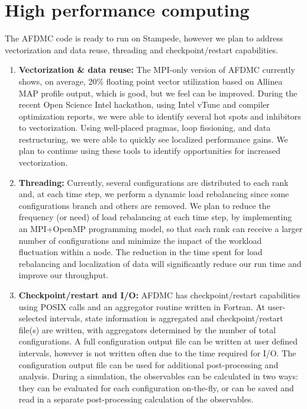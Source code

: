 \documentclass[12pt,letterpaper]{article}
\begin{document}
\section{High performance computing}

The AFDMC code is ready to run on Stampede, however we plan to address 
vectorization and data reuse, threading and checkpoint/restart capabilities.

\begin{enumerate}
\item \textbf{Vectorization \& data reuse:} The MPI-only version of AFDMC 
currently shows, on average, 20\% floating point vector utilization based on 
Allinea MAP profile output, which is good, but we feel can be improved. 
During the recent Open Science Intel hackathon, using Intel vTune and 
compiler optimization reports, we were able to identify several hot spots 
and inhibitors to vectorization. Using well-placed pragmas, loop fissioning, 
and data restructuring, we were able to quickly see localized performance 
gains. We plan to continue using these tools to identify opportunities for 
increased vectorization.

\item \textbf{Threading:}
Currently, several configurations are distributed to each rank and, at each 
time step, we perform a dynamic load rebalancing since some configurations 
branch and others are removed. We plan to reduce the frequency (or need) of 
load rebalancing at each time step, by implementing an MPI+OpenMP 
programming model, so that each rank can receive a larger number of 
configurations and minimize the impact of the workload fluctuation within a 
node. The reduction in the time spent for load rebalancing and localization 
of data will significantly reduce our run time and improve our throughput.

\item \textbf{Checkpoint/restart and I/O:}
AFDMC has checkpoint/restart capabilities using POSIX calls and an 
aggregator routine written in Fortran. At user-selected intervals, state 
information is aggregated and checkpoint/restart file(s) are written, with 
aggregators determined by the number of total configurations. A full 
configuration output file can be written at user defined intervals, however 
is not written often due to the time required for I/O. The configuration 
output file can be used for additional post-processing and analysis. During 
a simulation, the observables can be calculated in two ways: they can be 
evaluated for each configuration on-the-fly, or can be saved and read in a 
separate post-processing calculation of the observables.
\end{enumerate}
\end{document}
